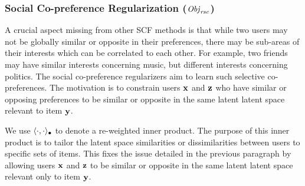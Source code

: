 \subsubsection{Social Co-preference Regularization ($\mathit{Obj}_{\mathit{rsc}}$)}
\label{sec:rsc}

A crucial aspect missing from other SCF methods is that while two
users may not be globally similar or opposite in their preferences,
there may be sub-areas of their interests which can be correlated to
each other.  For example, two friends may have similar interests
concerning music, but different interests concerning politics.  The
social co-preference regularizers aim to learn such selective
co-preferences. The motivation is to constrain users $\mathbf{x}$ and $\mathbf{z}$ who
have similar or opposing preferences to be similar or opposite in the
same latent latent space relevant to item $\mathbf{y}$.

We use $\langle \cdot, \cdot \rangle_{\bullet}$ to denote a re-weighted inner
product. The purpose of this inner product is to tailor the latent
space similarities or dissimilarities between users to specific sets
of items. This fixes the issue detailed in the previous paragraph by
allowing users $\mathbf{x}$ and $\mathbf{z}$ to be similar or opposite in the same
latent latent space relevant only to item $\mathbf{y}$.

